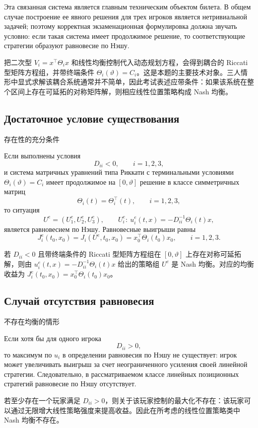 \documentclass[12pt,a4paper]{article}
\newcommand{\zh}[1]{\par\noindent #1\par}
\begin{document}
Эта связанная система является главным техническим объектом билета. В общем случае построение ее явного решения для трех игроков является нетривиальной задачей; поэтому корректная экзаменационная формулировка должна звучать условно: если такая система имеет продолжимое решение, то соответствующие стратегии образуют равновесие по Нэшу.
\zh{把二次型 \(V_i=x^\top\Theta_i x\) 和线性均衡控制代入动态规划方程，会得到耦合的 Riccati 型矩阵方程组，并带终端条件 \(\Theta_i(\vartheta)=C_i\)。这是本题的主要技术对象。三人情形中显式求解该耦合系统通常并不简单，因此考试表述应带条件：如果该系统在整个区间上存在可延拓的对称矩阵解，则相应线性位置策略构成 Nash 均衡。}

\subsection*{Достаточное условие существования}
\zh{存在性的充分条件}
Если выполнены условия
\[
D_{ii}<0,
\qquad i=1,2,3,
\]
и система матричных уравнений типа Риккати с терминальными условиями \(\Theta_i(\vartheta)=C_i\) имеет продолжимое на \([0,\vartheta]\) решение в классе симметричных матриц
\[
\Theta_i(t)=\Theta_i^{\top}(t),
\qquad i=1,2,3,
\]
то ситуация
\[
U^e=(U_1^e,U_2^e,U_3^e),
\qquad
U_i^e:\ u_i^e(t,x)=-D_{ii}^{-1}\Theta_i(t)x,
\]
является равновесием по Нэшу. Равновесные выигрыши равны
\[
J_i^e(t_0,x_0)=J_i(U^e,t_0,x_0)=x_0^{\top}\Theta_i(t_0)x_0,
\qquad i=1,2,3.
\]
\zh{若 \(D_{ii}<0\) 且带终端条件的 Riccati 型矩阵方程组在 \([0,\vartheta]\) 上存在对称可延拓解，则由 \(u_i^e(t,x)=-D_{ii}^{-1}\Theta_i(t)x\) 给出的策略组 \(U^e\) 是 Nash 均衡。对应的均衡收益为 \(J_i^e(t_0,x_0)=x_0^\top\Theta_i(t_0)x_0\)。}

\subsection*{Случай отсутствия равновесия}
\zh{不存在均衡的情形}
Если хотя бы для одного игрока
\[
D_{ii}>0,
\]
то максимум по \(u_i\) в определении равновесия по Нэшу не существует: игрок может увеличивать выигрыш за счет неограниченного усиления своей линейной стратегии. Следовательно, в рассматриваемом классе линейных позиционных стратегий равновесие по Нэшу отсутствует.
\zh{若至少存在一个玩家满足 \(D_{ii}>0\)，则关于该玩家控制的最大化不存在：该玩家可以通过无限增大线性策略强度来提高收益。因此在所考虑的线性位置策略类中 Nash 均衡不存在。}
\end{document}
